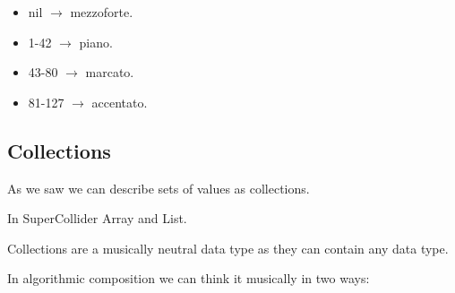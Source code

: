 \begin{itemize}
\tightlist
\item nil \(\rightarrow\) mezzoforte.
\item 1-42 \(\rightarrow\) piano.
\item 43-80 \(\rightarrow\) marcato.
\item 81-127 \(\rightarrow\) accentato.
\end{itemize}

\subsection{Collections}\label{collections}

As we saw we can describe sets of values \hspace{0pt}\hspace{0pt}as
collections.

In SuperCollider Array and List.

Collections are a musically neutral data type as they can contain any data type.

In algorithmic composition we can think it musically in two ways:

